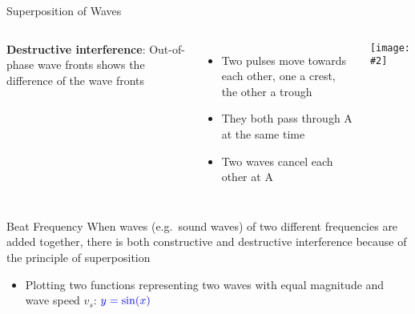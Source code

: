 \documentclass[12pt,aspectratio=169]{beamer}
\newcommand{\pic}[2]{\texttt{[image: \#2]}}
\begin{document}
\begin{frame}{Superposition of Waves}
  \begin{columns}
    \textbf{Destructive interference}: Out-of-phase wave fronts shows the
    difference of the wave fronts
    \begin{itemize}
    \item Two pulses move towards each other, one a crest, the other a trough
    \item They both pass through A at the same time
    \item Two waves cancel each other at A
    \end{itemize}
        
    \pic1{destructive}
  \end{columns}
\end{frame}


\begin{frame}{Beat Frequency}
  When waves (e.g.\ sound waves) of two different frequencies are added
  together, there is both constructive and destructive interference because of
  the principle of superposition
  \begin{itemize}
  \item Plotting two functions representing two waves with equal magnitude
    and wave speed $v_s$: $\color{blue}{y=\sin(x)}$
  \end{itemize}
  \begin{center}
    \vspace{-.1in}
  \end{center}
\end{frame}
\end{document}
